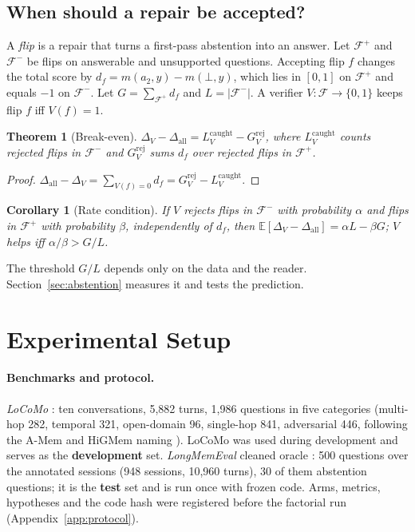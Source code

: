\documentclass[10pt]{article}
\theoremstyle{plain}
\newtheorem{theorem}{Theorem}
\newtheorem{corollary}{Corollary}
\theoremstyle{definition}
\newcommand{\F}{\mathcal{F}}
\begin{document}
\subsection{When should a repair be accepted?}
\label{sec:accept}

A \emph{flip} is a repair that turns a first-pass abstention into an answer. Let $\F^+$ and $\F^-$ be flips
on answerable and unsupported questions. Accepting flip $f$ changes the total score by
$d_f=m(a_2,y)-m(\bot,y)$, which lies in $[0,1]$ on $\F^+$ and equals $-1$ on $\F^-$. Let
$G=\sum_{\F^+}d_f$ and $L=|\F^-|$. A verifier $V:\F\to\{0,1\}$ keeps flip $f$ iff $V(f)=1$.

\begin{theorem}[Break-even]
\label{thm:breakeven}
$\Delta_V-\Delta_{\mathrm{all}}=L^{\mathrm{caught}}_V-G^{\mathrm{rej}}_V$, where $L^{\mathrm{caught}}_V$ counts
rejected flips in $\F^-$ and $G^{\mathrm{rej}}_V$ sums $d_f$ over rejected flips in $\F^+$.
\end{theorem}
\begin{proof}
$\Delta_{\mathrm{all}}-\Delta_V=\sum_{V(f)=0}d_f=G^{\mathrm{rej}}_V-L^{\mathrm{caught}}_V$.
\end{proof}

\begin{corollary}[Rate condition]
\label{cor:rate}
If $V$ rejects flips in $\F^-$ with probability $\alpha$ and flips in $\F^+$ with probability $\beta$,
independently of $d_f$, then $\mathbb{E}[\Delta_V-\Delta_{\mathrm{all}}]=\alpha L-\beta G$; $V$ helps iff
$\alpha/\beta>G/L$.
\end{corollary}

The threshold $G/L$ depends only on the data and the reader. Section~\ref{sec:abstention} measures it and
tests the prediction.

\section{Experimental Setup}
\label{sec:setup}

\paragraph{Benchmarks and protocol.} \emph{LoCoMo} \citep{maharana2024locomo}: ten conversations, 5,882
turns, 1,986 questions in five categories (multi-hop 282, temporal 321, open-domain 96, single-hop 841,
adversarial 446, following the A-Mem and HiGMem naming \citep{amem2025,cao2026higmem}). LoCoMo was used
during development and serves as the \textbf{development} set. \emph{LongMemEval} cleaned oracle
\citep{wu2024longmemeval}: 500 questions over the annotated sessions (948 sessions, 10,960 turns), 30 of
them abstention questions; it is the \textbf{test} set and is run once with frozen code. Arms, metrics,
hypotheses and the code hash were registered before the factorial run (Appendix~\ref{app:protocol}).
\end{document}
